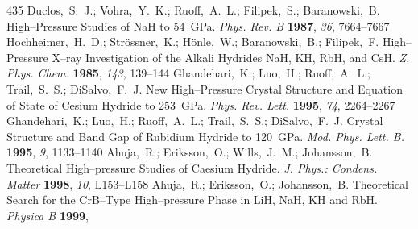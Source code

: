 \documentclass[12pt,letterpaper,oneside]{article}
\begin{document}
\begin{mcitethebibliography}{435}
\mciteBstWouldAddEndPuncttrue
\mciteSetBstMidEndSepPunct{\mcitedefaultmidpunct}
{\mcitedefaultendpunct}{\mcitedefaultseppunct}\relax
\EndOfBibitem
{}
Duclos,~S.~J.; Vohra,~Y.~K.; Ruoff,~A.~L.; Filipek,~S.; Baranowski,~B.
  High--Pressure Studies of NaH to 54~GPa. \emph{Phys. Rev. B} \textbf{1987},
  \emph{36}, 7664--7667\relax
\mciteBstWouldAddEndPuncttrue
\mciteSetBstMidEndSepPunct{\mcitedefaultmidpunct}
{\mcitedefaultendpunct}{\mcitedefaultseppunct}\relax
\EndOfBibitem
{}
Hochheimer,~H.~D.; Str{\"o}ssner,~K.; H{\"o}nle,~W.; Baranowski,~B.;
  Filipek,~F. High--Pressure X--ray Investigation of the Alkali Hydrides NaH,
  KH, RbH, and CsH. \emph{Z. Phys. Chem.} \textbf{1985}, \emph{143},
  139--144\relax
\mciteBstWouldAddEndPuncttrue
\mciteSetBstMidEndSepPunct{\mcitedefaultmidpunct}
{\mcitedefaultendpunct}{\mcitedefaultseppunct}\relax
\EndOfBibitem
{}
Ghandehari,~K.; Luo,~H.; Ruoff,~A.~L.; Trail,~S.~S.; DiSalvo,~F.~J. New
  High--Pressure Crystal Structure and Equation of State of Cesium Hydride to
  253~GPa. \emph{Phys. Rev. Lett.} \textbf{1995}, \emph{74}, 2264--2267\relax
\mciteBstWouldAddEndPuncttrue
\mciteSetBstMidEndSepPunct{\mcitedefaultmidpunct}
{\mcitedefaultendpunct}{\mcitedefaultseppunct}\relax
\EndOfBibitem
{}
Ghandehari,~K.; Luo,~H.; Ruoff,~A.~L.; Trail,~S.~S.; DiSalvo,~F.~J. Crystal
  Structure and Band Gap of Rubidium Hydride to 120~GPa. \emph{Mod. Phys. Lett.
  B.} \textbf{1995}, \emph{9}, 1133--1140\relax
\mciteBstWouldAddEndPuncttrue
\mciteSetBstMidEndSepPunct{\mcitedefaultmidpunct}
{\mcitedefaultendpunct}{\mcitedefaultseppunct}\relax
\EndOfBibitem
{}
Ahuja,~R.; Eriksson,~O.; Wills,~J.~M.; Johansson,~B. Theoretical High--pressure
  Studies of Caesium Hydride. \emph{J. Phys.: Condens. Matter} \textbf{1998},
  \emph{10}, L153--L158\relax
\mciteBstWouldAddEndPuncttrue
\mciteSetBstMidEndSepPunct{\mcitedefaultmidpunct}
{\mcitedefaultendpunct}{\mcitedefaultseppunct}\relax
\EndOfBibitem
{}
Ahuja,~R.; Eriksson,~O.; Johansson,~B. Theoretical Search for the CrB--Type
  High--pressure Phase in LiH, NaH, KH and RbH. \emph{Physica B} \textbf{1999},

\end{mcitethebibliography}
\end{document}
